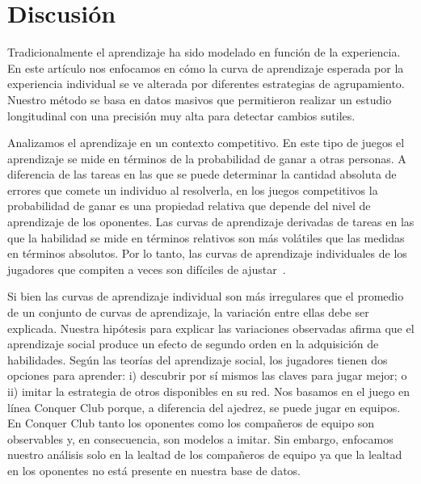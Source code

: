 \documentclass[a4paper,11pt]{book}
\theoremstyle{definition}
\begin{document}
\section{Discusi\'on}

Tradicionalmente el aprendizaje ha sido modelado en funci\'on de la experiencia.
%
En este art\'iculo nos enfocamos en c\'omo la curva de aprendizaje esperada por la experiencia individual se ve alterada por diferentes estrategias de agrupamiento.
%
Nuestro m\'etodo se basa en datos masivos que permitieron realizar un estudio longitudinal con una precisi\'on muy alta para detectar cambios sutiles.


Analizamos el aprendizaje en un contexto competitivo.
%
En este tipo de juegos el aprendizaje se mide en t\'erminos de la probabilidad de ganar a otras personas.
%
A diferencia de las tareas en las que se puede determinar la cantidad absoluta de errores que comete un individuo al resolverla, en los juegos competitivos la probabilidad de ganar es una propiedad relativa que depende del nivel de aprendizaje de los oponentes.
%
Las curvas de aprendizaje derivadas de tareas en las que la habilidad se mide en t\'erminos relativos son m\'as vol\'atiles que las medidas en t\'erminos absolutos.
%
Por lo tanto, las curvas de aprendizaje individuales de los jugadores que compiten a veces son dif\'iciles de ajustar~\cite{howard2014-learningCurvesChessPlayersATestOfPowerLawGenerality,Gaschler2014}.


Si bien las curvas de aprendizaje individual son m\'as irregulares que el promedio de un conjunto de curvas de aprendizaje, la variaci\'on entre ellas debe ser explicada.
%
Nuestra hip\'otesis para explicar las variaciones observadas afirma que el aprendizaje social produce un efecto de segundo orden en la adquisici\'on de habilidades.
%
Seg\'un las teor\'ias del aprendizaje social, los jugadores tienen dos opciones para aprender: i) descubrir por s\'i mismos las claves para jugar mejor; o ii) imitar la estrategia de otros disponibles en su red.
%
Nos basamos en el juego en l\'inea Conquer Club porque, a diferencia del ajedrez, se puede jugar en equipos.
%
En Conquer Club tanto los oponentes como los compa\~neros de equipo son observables y, en consecuencia, son modelos a imitar.
%
Sin embargo, enfocamos nuestro an\'alisis solo en la lealtad de los compa\~neros de equipo ya que la lealtad en los oponentes no est\'a presente en nuestra base de datos.
\end{document}
